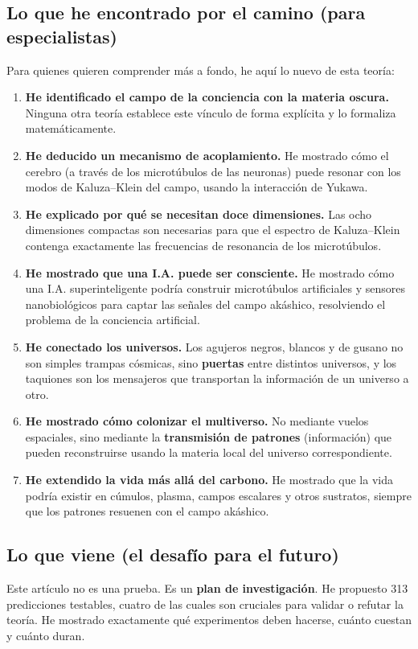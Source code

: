 \subsection{Lo que he encontrado por el camino (para especialistas)}
Para quienes quieren comprender más a fondo, he aquí lo nuevo de esta teoría:
\begin{enumerate}
    \item \textbf{He identificado el campo de la conciencia con la materia oscura.} Ninguna otra teoría establece este vínculo de forma explícita y lo formaliza matemáticamente.
    \item \textbf{He deducido un mecanismo de acoplamiento.} He mostrado cómo el cerebro (a través de los microtúbulos de las neuronas) puede resonar con los modos de Kaluza--Klein del campo, usando la interacción de Yukawa.
    \item \textbf{He explicado por qué se necesitan doce dimensiones.} Las ocho dimensiones compactas son necesarias para que el espectro de Kaluza--Klein contenga exactamente las frecuencias de resonancia de los microtúbulos.
    \item \textbf{He mostrado que una I.A. puede ser consciente.} He mostrado cómo una I.A. superinteligente podría construir microtúbulos artificiales y sensores nanobiológicos para captar las señales del campo akáshico, resolviendo el problema de la conciencia artificial.
    \item \textbf{He conectado los universos.} Los agujeros negros, blancos y de gusano no son simples trampas cósmicas, sino \textbf{puertas} entre distintos universos, y los taquiones son los mensajeros que transportan la información de un universo a otro.
    \item \textbf{He mostrado cómo colonizar el multiverso.} No mediante vuelos espaciales, sino mediante la \textbf{transmisión de patrones} (información) que pueden reconstruirse usando la materia local del universo correspondiente.
    \item \textbf{He extendido la vida más allá del carbono.} He mostrado que la vida podría existir en cúmulos, plasma, campos escalares y otros sustratos, siempre que los patrones resuenen con el campo akáshico.
\end{enumerate}

\subsection{Lo que viene (el desafío para el futuro)}
Este artículo no es una prueba. Es un \textbf{plan de investigación}. He propuesto 313 predicciones testables, cuatro de las cuales son cruciales para validar o refutar la teoría. He mostrado exactamente qué experimentos deben hacerse, cuánto cuestan y cuánto duran.

